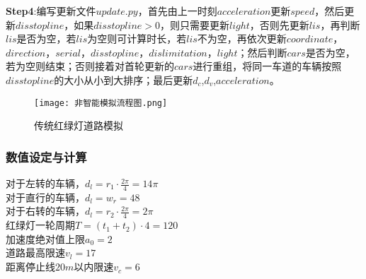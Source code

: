 \documentclass[a4paper,12pt]{article}
\numberwithin{equation}{section}
\newcommand{\upcite}[1]{\textsuperscript{\textsuperscript{\cite{#1}}}}
\begin{document}
	\textbf{Step4}:编写更新文件$update.py$，首先由上一时刻$acceleration$更新$speed$，然后更新$disstopline$，如果$disstopline>0$，则只需要更新$light$，否则先更新$lis$，再判断$lis$是否为空，若$lis$为空则可计算时长，若$lis$不为空，再依次更新$coordinate$，$direction$，$serial$，$disstopline$，$dislimitation$，$light$；然后判断$cars$是否为空，若为空则结束；否则接着对首轮更新的$cars$进行重组，将同一车道的车辆按照$disstopline$的大小从小到大排序；最后更新$d_c$,$d_v$,$acceleration$。
		\begin{figure}[H]
		\centering
		\texttt{[image: 非智能模拟流程图.png]}\caption{传统红绿灯道路模拟}
		\label{非智能模拟流程}
	\end{figure}
	\subsubsection{数值设定与计算}
	\noindent 对于左转的车辆，$d_l=r_1\cdot \frac{2\pi}{4}=14\pi$\\
	对于直行的车辆，$d_l=w_r=48$\\
	对于右转的车辆，$d_l=r_2\cdot\frac{2\pi}{4}=2\pi$\\
	红绿灯一轮周期$T=(t_1+t_2)\cdot 4=120$\\
	加速度绝对值上限$a_0=2$\\
	道路最高限速$v_l=17$\upcite{ref4,ref6}\\
	距离停止线$20m$以内限速$v_c=6$\\
\end{document}
